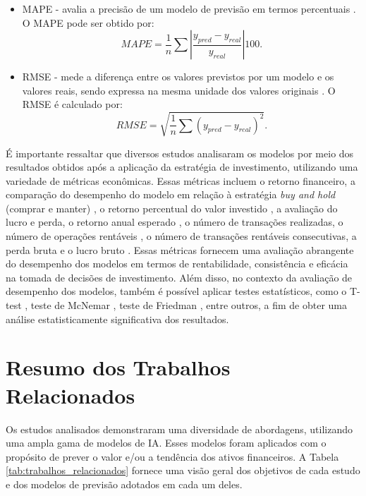 \begin{itemize}
    \item \ac{MAPE} - avalia a precisão de um modelo de previsão em termos percentuais \cite{Anand_Comparison, Firat}. O \ac{MAPE} pode ser obtido por:
    \begin{equation}
        \label{eq:MAPE}
        MAPE = \frac{1}{n} \sum \left | \frac{y_{pred} - y_{real}}{y_{real}} \right | 100.
    \end{equation}
    
    \item \ac{RMSE} - mede a diferença entre os valores previstos por um modelo e os valores reais, sendo expressa na mesma unidade dos valores originais \cite{altan2019effect, pabucccu2023forecasting}. O \ac{RMSE} é calculado por:
    \begin{equation}
        \label{eq:RMSE}
        RMSE = \sqrt{\frac{1}{n} \sum(y_{pred} - y_{real})^2}.
    \end{equation}
\end{itemize}


É importante ressaltar que diversos estudos analisaram os modelos por meio dos resultados obtidos após a aplicação da estratégia de investimento, utilizando uma variedade de métricas econômicas. Essas métricas incluem o retorno financeiro, a comparação do desempenho do modelo em relação à estratégia \textit{buy and hold} (comprar e manter) \cite{Ciniro_Econometric}, o retorno percentual do valor investido \cite{Chaojie_Stock}, a avaliação do lucro e perda, o retorno anual esperado \cite{Charlene}, o número de transações realizadas, o número de operações rentáveis \cite{C_Veeramani_Exploration}, o número de transações rentáveis consecutivas, a perda bruta e o lucro bruto \cite{Jerzy_Deep}. Essas métricas fornecem uma avaliação abrangente do desempenho dos modelos em termos de rentabilidade, consistência e eficácia na tomada de decisões de investimento. Além disso, no contexto da avaliação de desempenho dos modelos, também é possível aplicar testes estatísticos, como o T-test \cite{kim2015t}, teste de McNemar \cite{mcnemar1947note}, teste de Friedman \cite{sheldon1996use}, entre outros, a fim de obter uma análise estatisticamente significativa dos resultados.

\section{Resumo dos Trabalhos Relacionados}
\label{subsec:resumo}
Os estudos analisados demonstraram uma diversidade de abordagens, utilizando uma ampla gama de modelos de \ac{IA}. Esses modelos foram aplicados com o propósito de prever o valor e/ou a tendência dos ativos financeiros. A Tabela \ref{tab:trabalhos_relacionados} fornece uma visão geral dos objetivos de cada estudo e dos modelos de previsão adotados em cada um deles.

